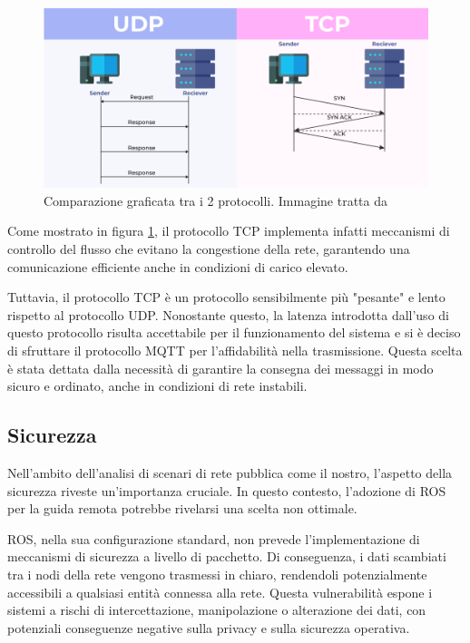 \begin{figure}[H]
  \centering
  \includegraphics[width=1\textwidth]{figures/tcp_vs_udp_geeksforgeeks.png}
  \caption{Comparazione graficata tra i 2 protocolli. Immagine tratta da \cite{TCPvsUDP_geeksforgeeks}}
  \label{tcp_v_udp}
\end{figure}

\noindent Come mostrato in figura \ref{tcp_v_udp}, il protocollo TCP implementa infatti meccanismi di controllo del flusso che evitano la congestione della rete, garantendo una comunicazione efficiente anche in condizioni di carico elevato.

\noindent Tuttavia, il protocollo TCP è un protocollo sensibilmente più "pesante" e lento rispetto al protocollo UDP. Nonostante questo, la latenza introdotta dall'uso di questo protocollo risulta accettabile per il funzionamento del sistema e si è deciso di sfruttare il protocollo MQTT per l'affidabilità nella trasmissione. Questa scelta è stata dettata dalla necessità di garantire la consegna dei messaggi in modo sicuro e ordinato, anche in condizioni di rete instabili.

\subsection{Sicurezza}
\noindent Nell'ambito dell'analisi di scenari di rete pubblica come il nostro, l'aspetto della sicurezza riveste un'importanza cruciale. In questo contesto, l'adozione di ROS per la guida remota potrebbe rivelarsi una scelta non ottimale.

\noindent ROS, nella sua configurazione standard, non prevede l'implementazione di meccanismi di sicurezza a livello di pacchetto. Di conseguenza, i dati scambiati tra i nodi della rete vengono trasmessi in chiaro, rendendoli potenzialmente accessibili a qualsiasi entità connessa alla rete. Questa vulnerabilità espone i sistemi a rischi di intercettazione, manipolazione o alterazione dei dati, con potenziali conseguenze negative sulla privacy e sulla sicurezza operativa.

